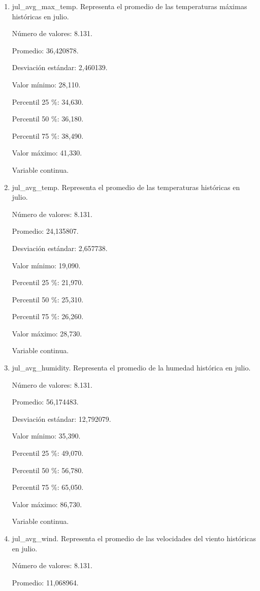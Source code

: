\begin{enumerate}
	\item jul\_avg\_max\_temp. Representa el promedio de las temperaturas máximas históricas en julio.
	
	Número de valores: 8.131.
	
	Promedio: 36,420878.
	
	Desviación estándar: 2,460139.
	
	Valor mínimo: 28,110.
	
	Percentil 25 \%: 34,630.
	
	Percentil 50 \%: 36,180.
	
	Percentil 75 \%: 38,490.
	
	Valor máximo: 41,330.
	
	Variable continua.

	\item jul\_avg\_temp. Representa el promedio de las temperaturas históricas en julio.
	
	Número de valores: 8.131.
	
	Promedio: 24,135807.
	
	Desviación estándar: 2,657738.
	
	Valor mínimo: 19,090.
	
	Percentil 25 \%: 21,970.
	
	Percentil 50 \%: 25,310.
	
	Percentil 75 \%: 26,260.
	
	Valor máximo: 28,730.
	
	Variable continua.

	\item jul\_avg\_humidity. Representa el promedio de la humedad histórica en julio.
	
	Número de valores: 8.131.
	
	Promedio: 56,174483.
	
	Desviación estándar: 12,792079.
	
	Valor mínimo: 35,390.
	
	Percentil 25 \%: 49,070.
	
	Percentil 50 \%: 56,780.
	
	Percentil 75 \%: 65,050.
	
	Valor máximo: 86,730.
	
	Variable continua.

	\item jul\_avg\_wind. Representa el promedio de las velocidades del viento históricas en julio.
	
	Número de valores: 8.131.
	
	Promedio: 11,068964.
	

\end{enumerate}

